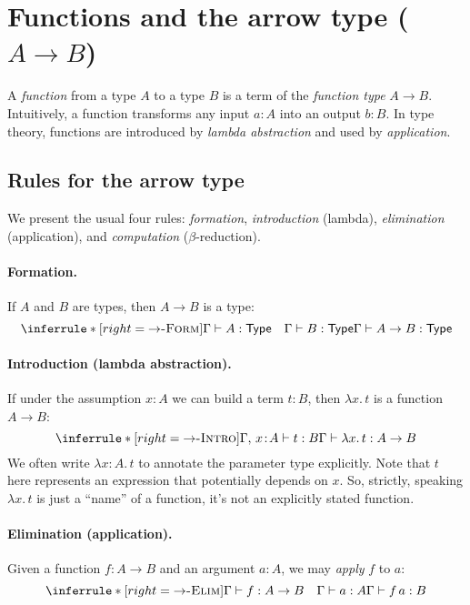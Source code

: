 \documentclass{article}
\newcommand{\Type}{\ensuremath{\mathsf{Type}}}
\newcommand{\judg}[3]{#1 \vdash #2 : #3}   %
\newcommand{\rulename}[1]{\textsc{#1}}
\begin{document}
\section{Functions and the arrow type \texorpdfstring{(\(A \to B\))}{(A -> B)}}

A \emph{function} from a type \(A\) to a type \(B\) is a term of the
\emph{function type} \(A \to B\). Intuitively, a function transforms any input \(a:A\)
into an output \(b:B\). In type theory, functions are introduced by
\emph{lambda abstraction} and used by \emph{application}.

\subsection*{Rules for the arrow type}

We present the usual four rules: \emph{formation}, \emph{introduction} (lambda),
\emph{elimination} (application), and \emph{computation} (\(\beta\)-reduction).

\paragraph{Formation.}
If \(A\) and \(B\) are types, then \(A \to B\) is a type:
\[
\inferrule*[right=\rulename{\(\to\)-Form}]{
  \judg{\Gamma}{A}{\Type}
  \quad
  \judg{\Gamma}{B}{\Type}
}{
  \judg{\Gamma}{A \to B}{\Type}
}
\]

\paragraph{Introduction (lambda abstraction).}
If under the assumption \(x:A\) we can build a term \(t:B\), then
\(\lambda x.\,t\) is a function \(A \to B\):
\[
\inferrule*[right=\rulename{\(\to\)-Intro}]{
  \judg{\Gamma,\,x\!:\!A}{t}{B}
}{
  \judg{\Gamma}{\lambda x.\,t}{A \to B}
}
\]
We often write \(\lambda x:A.\,t\) to annotate the parameter type explicitly. Note that $t$ here represents an expression that potentially depends on $x$. So, strictly, speaking $\lambda x.\,t$ is just a ``name'' of a function, it's not an explicitly stated function.

\paragraph{Elimination (application).}
Given a function \(f:A\to B\) and an argument \(a:A\), we may \emph{apply} \(f\) to \(a\):
\[
\inferrule*[right=\rulename{\(\to\)-Elim}]{
  \judg{\Gamma}{f}{A \to B}
  \quad
  \judg{\Gamma}{a}{A}
}{
  \judg{\Gamma}{f\,a}{B}
}
\]
\end{document}
